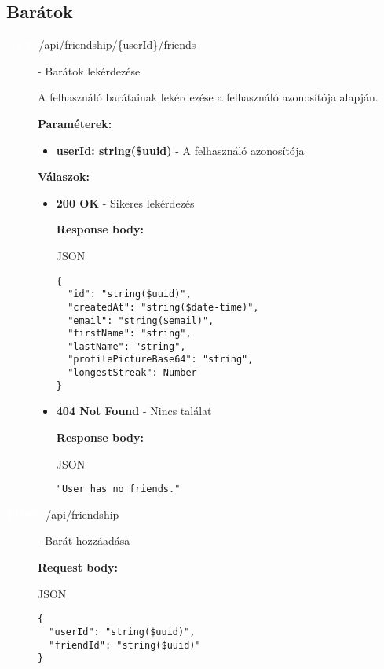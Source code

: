 \documentclass[12pt]{report}
\newcommand{\httpGet}[1]{\colorbox{getColor}{\textbf{\textcolor{white}{GET}}}~#1}
\newcommand{\httpPost}[1]{\colorbox{postColor}{\textbf{\textcolor{white}{POST}}}~#1}
\begin{document}
\subsection{Barátok}
\begin{description}
  \item[\httpGet{/api/friendship/\{userId\}/friends}] - Barátok lekérdezése

    \vspace{0.5cm}
    A felhasználó barátainak lekérdezése a felhasználó azonosítója alapján.

    \vspace{0.5cm}
    \textbf{Paraméterek:}
    \begin{itemize}
      \item \textbf{userId: string(\$uuid)} - A felhasználó azonosítója
    \end{itemize}

    \vspace{0.5cm}
    \textbf{Válaszok:}
    \begin{itemize}
      \item \textbf{200 OK} - Sikeres lekérdezés

        \textbf{Response body:}
        \begin{codeblock}{JSON}
          \begin{verbatim}
{
  "id": "string($uuid)",
  "createdAt": "string($date-time)",
  "email": "string($email)",
  "firstName": "string",
  "lastName": "string",
  "profilePictureBase64": "string",
  "longestStreak": Number
}
          \end{verbatim}
        \end{codeblock}

      \item \textbf{404 Not Found} - Nincs találat
      
        \textbf{Response body:}
        \begin{codeblock}{JSON}
          \begin{verbatim}
"User has no friends."
          \end{verbatim}
        \end{codeblock}
    \end{itemize}

  \item[\httpPost{/api/friendship}] - Barát hozzáadása
  
    \vspace{0.5cm}
    \textbf{Request body:}
    \begin{codeblock}{JSON}
      \begin{verbatim}
{
  "userId": "string($uuid)",
  "friendId": "string($uuid)"
}
      \end{verbatim}
    \end{codeblock}


\end{description}
\end{document}

